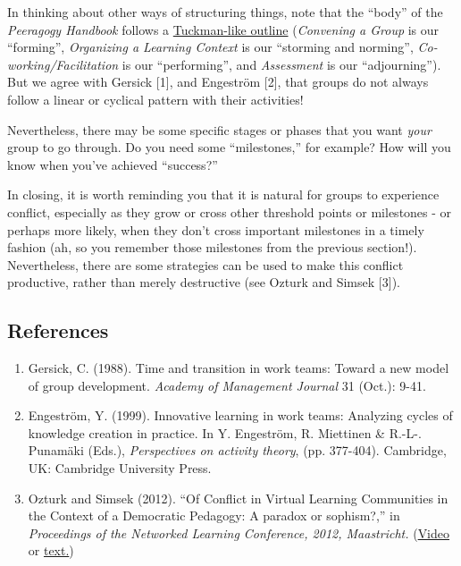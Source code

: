 In thinking about other ways of structuring things, note that the
``body'' of the \emph{Peeragogy Handbook} follows a
\href{http://en.wikipedia.org/wiki/Forming-storming-norming-performing}{Tuckman-like
outline} (\emph{Convening a Group} is our ``forming'', \emph{Organizing
a Learning Context} is our ``storming and norming'',
\emph{Co-working/Facilitation} is our ``performing'', and
\emph{Assessment} is our ``adjourning''). But we agree with Gersick
{[}1{]}, and Engeström {[}2{]}, that groups do not always follow a
linear or cyclical pattern with their activities!

Nevertheless, there may be some specific stages or phases that you want
\emph{your} group to go through. Do you need some ``milestones,'' for
example? How will you know when you've achieved ``success?''

In closing, it is worth reminding you that it is natural for groups to
experience conflict, especially as they grow or cross other threshold
points or milestones - or perhaps more likely, when they don't cross
important milestones in a timely fashion (ah, so you remember those
milestones from the previous section!). Nevertheless, there are some
strategies can be used to make this conflict productive, rather than
merely destructive (see Ozturk and Simsek {[}3{]}).

\subsection{References}

\begin{enumerate}
\itemsep1pt\parskip0pt
\item
  Gersick, C. (1988). Time and transition in work teams: Toward a new
  model of group development. \emph{Academy of Management Journal} 31
  (Oct.): 9-41.
\item
  Engeström, Y. (1999). Innovative learning in work teams: Analyzing
  cycles of knowledge creation in practice. In Y. Engeström, R.
  Miettinen \& R.-L-. Punamäki (Eds.), \emph{Perspectives on activity
  theory}, (pp. 377-404). Cambridge, UK: Cambridge University Press.
\item
  Ozturk and Simsek (2012). ``Of Conflict in Virtual Learning Communities in
  the Context of a Democratic Pedagogy: A paradox or sophism?,'' in
  \emph{Proceedings of the Networked Learning Conference, 2012,
  Maastricht.} (\href{http://www.lancaster.ac.uk/fass/edres/seminars/Ozturk300311.htm}{Video}
  or
  \href{http://networkedlearningconference.org.uk/abstracts/pdf/ozturk.pdf}{text.})
\end{enumerate}

